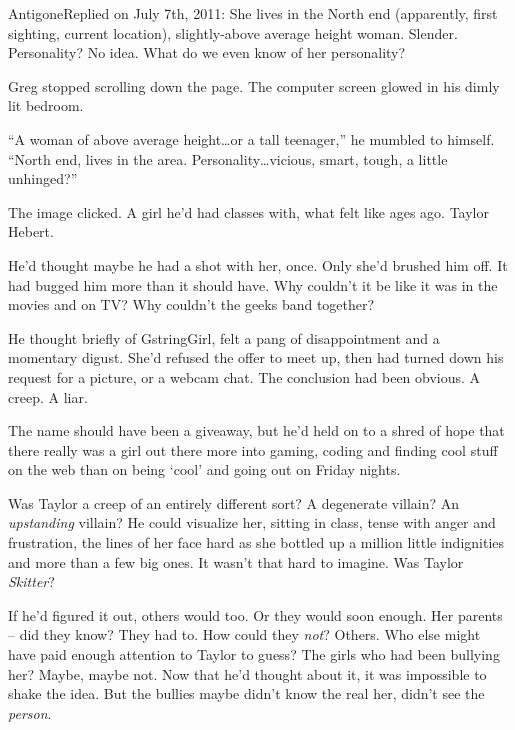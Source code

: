 \blacktriangleright AntigoneReplied on July 7th, 2011:
She lives in the North end (apparently, first sighting, current location), slightly-above average height woman.  Slender.  Personality?  No idea.  What do we even know of her personality?



\sectionbreak



Greg stopped scrolling down the page.  The computer screen glowed in his dimly lit bedroom.



``A woman of above average height\ldots or a tall teenager,'' he mumbled to himself.  ``North end, lives in the area.  Personality\ldots vicious, smart, tough, a little unhinged?''



The image clicked.  A girl he'd had classes with, what felt like ages ago.  Taylor Hebert.



He'd thought maybe he had a shot with her, once.  Only she'd brushed him off.  It had bugged him more than it should have.  Why couldn't it be like it was in the movies and on TV?  Why couldn't the geeks band together?



He thought briefly of GstringGirl, felt a pang of disappointment and a momentary digust.  She'd refused the offer to meet up, then had turned down his request for a picture, or a webcam chat.  The conclusion had been obvious.  A creep.  A liar.



The name should have been a giveaway, but he'd held on to a shred of hope that there really was a girl out there more into gaming, coding and finding cool stuff on the web than on being `cool' and going out on Friday nights.



Was Taylor a creep of an entirely different sort?  A degenerate villain?  An \emph{upstanding} villain?  He could visualize her, sitting in class, tense with anger and frustration, the lines of her face hard as she bottled up a million little indignities and more than a few big ones.  It wasn't that hard to imagine.  Was Taylor \emph{Skitter}?



If he'd figured it out, others would too.  Or they would soon enough.  Her parents – did they know?  They had to.  How could they \emph{not}?  Others.  Who else might have paid enough attention to Taylor to guess?  The girls who had been bullying her?  Maybe, maybe not.  Now that he'd thought about it, it was impossible to shake the idea.  But the bullies maybe didn't know the real her, didn't see the \emph{person}.



